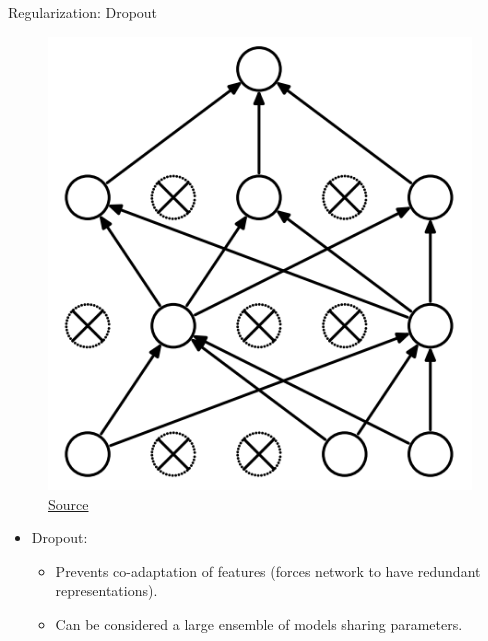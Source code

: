 \begin{frame}{Regularization: Dropout}
\noindent\begin{minipage}{0.4\textwidth}
\begin{figure}[H]
	\centering
	\includegraphics[width=\textwidth]{Images/Dropout-after.png}
	\caption{\href{https://www.cs.toronto.edu/~hinton/absps/JMLRdropout.pdf}{Source}}
\end{figure}
\end{minipage}
\noindent\begin{minipage}{0.4\textwidth}
\begin{itemize}
	\item Dropout:
	\begin{itemize}
		\item Prevents co-adaptation of features (forces network to have redundant representations).
		\item Can be considered a large ensemble of models sharing parameters.
	\end{itemize}
\end{itemize}
\end{minipage}
\end{frame}

